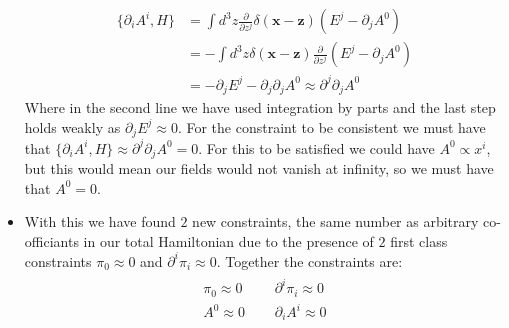 \documentclass[11pt]{article}
\numberwithin{equation}{section}
\begin{document}
\begin{itemize}
    \begin{align*}
      \{\partial_iA^i,H\}  &= \int d^3z\frac{\partial}{\partial z^j}\delta(\textbf{x}-\textbf{z})\left(E^j - \partial_jA^0\right) \\
      & = -\int d^3z\delta(\textbf{x}-\textbf{z})\frac{\partial}{\partial z^j}\left(E^j - \partial_jA^0\right) \\
      & = -\partial_jE^j - \partial_j\partial_jA^0 \approx  \partial^j\partial_jA^0 
    \end{align*}
    Where in the second line we have used integration by parts and the last step holds weakly as $\partial_jE^j \approx 0$. For the constraint to be consistent we must have that $\{\partial_iA^i,H\} \approx \partial^j\partial_jA^0 = 0$. For this to be satisfied we could have $A^0 \propto x^i$, but this would mean our fields would not vanish at infinity, so we must have that $A^0 =0$. 

    \item With this we have found $2$ new constraints, the same number as arbitrary co-officiants in our total Hamiltonian due to the presence of $2$ first class constraints $\pi_0\approx 0$ and $\partial^i\pi_i \approx 0$. Together the constraints are:
    \begin{align}  
    \label{constraints_gauge}
        \begin{split}
          \pi_0 \approx 0 ~~& ~~~~\partial^i\pi_i \approx 0  \\
        A^0 \approx 0 ~~& ~~~~ \partial_iA^i \approx 0
        \end{split}
      \end{align}
\end{itemize}
\end{document}
